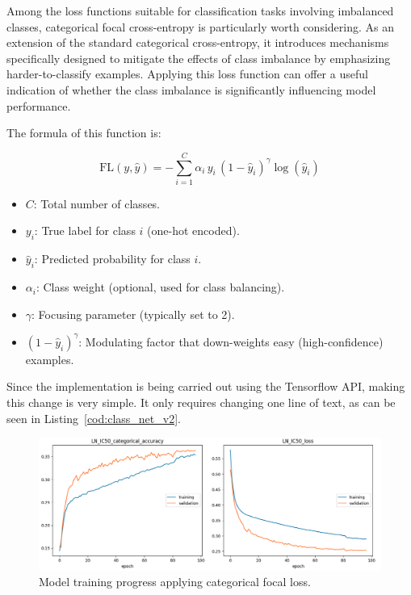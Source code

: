 Among the loss functions suitable for classification tasks involving imbalanced classes, categorical focal cross-entropy is particularly worth considering. As an extension of the standard categorical cross-entropy, it introduces mechanisms specifically designed to mitigate the effects of class imbalance by emphasizing harder-to-classify examples. Applying this loss function can offer a useful indication of whether the class imbalance is significantly influencing model performance. 

The formula of this function is:

\[
\text{FL}(y, \hat{y}) = -\sum_{i=1}^{C} \alpha_i \, y_i \, (1 - \hat{y}_i)^\gamma \log(\hat{y}_i)
\]

\begin{itemize}
    \item \( C \): Total number of classes.
    \item \( y_i \): True label for class \( i \) (one-hot encoded).
    \item \( \hat{y}_i \): Predicted probability for class \( i \).
    \item \( \alpha_i \): Class weight (optional, used for class balancing).
    \item \( \gamma \): Focusing parameter (typically set to 2).
    \item \( (1 - \hat{y}_i)^\gamma \): Modulating factor that down-weights easy (high-confidence) examples.
\end{itemize}

Since the implementation is being carried out using the Tensorflow API, making this change is very simple. It only requires changing one line of text, as can be seen in Listing~\ref{cod:class_net_v2}.

\begin{figure}[H]
    \centering
    \includegraphics[width=1\textwidth]{figures/neural_net_classification/classification_mse_v2.png}
    \caption{Model training progress applying categorical focal loss.}
    \label{fig:train_class_net_v2}
\end{figure}

